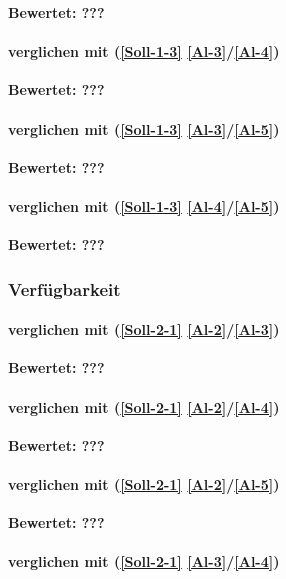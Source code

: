 \textbf{Bewertet: ???}

\paragraph*{  verglichen mit  (\ref{Soll-1-3} \ref{Al-3}/\ref{Al-4})}

\textbf{Bewertet: ???}

\paragraph*{  verglichen mit  (\ref{Soll-1-3} \ref{Al-3}/\ref{Al-5})}

\textbf{Bewertet: ???}


\paragraph*{  verglichen mit  (\ref{Soll-1-3} \ref{Al-4}/\ref{Al-5})}

\textbf{Bewertet: ???}


\subsubsection{Verfügbarkeit}

\paragraph*{  verglichen mit  (\ref{Soll-2-1} \ref{Al-2}/\ref{Al-3})}

\textbf{Bewertet: ???}

\paragraph*{  verglichen mit  (\ref{Soll-2-1} \ref{Al-2}/\ref{Al-4})}

\textbf{Bewertet: ???}

\paragraph*{  verglichen mit  (\ref{Soll-2-1} \ref{Al-2}/\ref{Al-5})}

\textbf{Bewertet: ???}

\paragraph*{  verglichen mit  (\ref{Soll-2-1} \ref{Al-3}/\ref{Al-4})}

